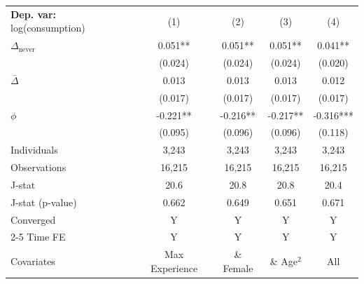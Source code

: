 \begin{tabular}{l cccc} \toprule  \textbf{Dep. var:}  log(consumption) 
                    &\multicolumn{1}{c}{(1)}   &\multicolumn{1}{c}{(2)}   &\multicolumn{1}{c}{(3)}   &\multicolumn{1}{c}{(4)}   \\

\addlinespace
$\Delta_{\text{never}}$&       0.051** &       0.051** &       0.051** &       0.041** \\
                    &     (0.024)   &     (0.024)   &     (0.024)   &     (0.020)   \\

\addlinespace
$\bar{\Delta}$      &       0.013   &       0.013   &       0.013   &       0.012   \\
                    &     (0.017)   &     (0.017)   &     (0.017)   &     (0.017)   \\

\addlinespace
$\phi$              &      -0.221** &      -0.216** &      -0.217** &      -0.316***\\
                    &     (0.095)   &     (0.096)   &     (0.096)   &     (0.118)   \\
\addlinespace
Individuals         &       3,243   &       3,243   &       3,243   &       3,243   \\
Observations        &      16,215   &      16,215   &      16,215   &      16,215   \\
J-stat              &        20.6   &        20.8   &        20.8   &        20.4   \\
J-stat (p-value)    &       0.662   &       0.649   &       0.651   &       0.671   \\
Converged           &           Y   &           Y   &           Y   &           Y   \\
\cmidrule{2-5} Time FE & Y & Y & Y & Y \\ Covariates & Max Experience & \& Female & \& Age$^2$ & All \\ \bottomrule \end{tabular}
